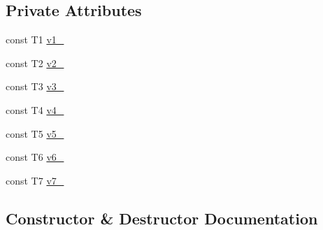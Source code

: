 \subsection*{Private Attributes}
\begin{DoxyCompactItemize}
\item 
const T1 \mbox{\hyperlink{classtesting_1_1internal_1_1_value_array7_ab89ecfca061a2ed44da53c07fe0b402f}{v1\+\_\+}}
\item 
const T2 \mbox{\hyperlink{classtesting_1_1internal_1_1_value_array7_aa979b24744404c6c6afc2a1de66b9a76}{v2\+\_\+}}
\item 
const T3 \mbox{\hyperlink{classtesting_1_1internal_1_1_value_array7_aacd023ee37b23e8791ccfad43b036d62}{v3\+\_\+}}
\item 
const T4 \mbox{\hyperlink{classtesting_1_1internal_1_1_value_array7_a0f2586c1a4f7e943b8aa90c13416e274}{v4\+\_\+}}
\item 
const T5 \mbox{\hyperlink{classtesting_1_1internal_1_1_value_array7_a121fbd6450f99749628a8cce731c6aaf}{v5\+\_\+}}
\item 
const T6 \mbox{\hyperlink{classtesting_1_1internal_1_1_value_array7_a0c8d9281548832942cef2b008cdd2727}{v6\+\_\+}}
\item 
const T7 \mbox{\hyperlink{classtesting_1_1internal_1_1_value_array7_a3ffae36b5a10fee9f049b4465f7bb58a}{v7\+\_\+}}
\end{DoxyCompactItemize}


\subsection{Constructor \& Destructor Documentation}
\mbox{\label{classtesting_1_1internal_1_1_value_array7_a34570dbbcc50d20f94e4a0c693e42f09}} 
